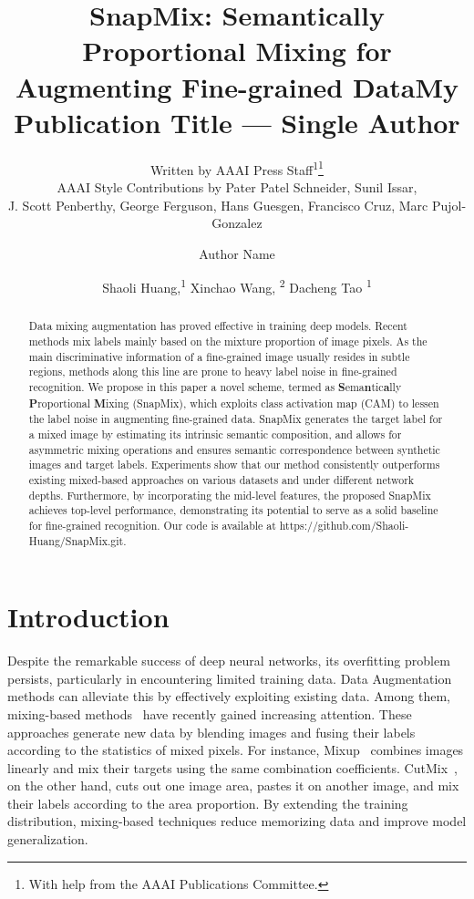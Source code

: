 \documentclass[letterpaper]{article} \usepackage{aaai21}  \usepackage{times}  \usepackage{helvet} \usepackage{courier}  \usepackage[hyphens]{url}  \usepackage{graphicx} \urlstyle{rm} \def\UrlFont{\rm}  \usepackage{natbib}  \usepackage{caption} \frenchspacing  \setlength{\pdfpagewidth}{8.5in}  \setlength{\pdfpageheight}{11in}
\title{SnapMix: Semantically Proportional Mixing for Augmenting Fine-grained Data}
\author{

Written by AAAI Press Staff\textsuperscript{\rm 1}\thanks{With help from the AAAI Publications Committee.}\\
    AAAI Style Contributions by Pater Patel Schneider,
    Sunil Issar,  \\
    J. Scott Penberthy,
    George Ferguson,
    Hans Guesgen,
    Francisco Cruz,
    Marc Pujol-Gonzalez
    \\
}
\title{My Publication Title --- Single Author}
\author {
Author Name \\
}
\author {
Shaoli Huang,\textsuperscript{\rm 1}
        Xinchao Wang, \textsuperscript{\rm 2}
        Dacheng Tao \textsuperscript{\rm 1} \\
}
\begin{document}
\maketitle

\begin{abstract}
Data mixing augmentation has proved effective in training deep models.
Recent methods mix labels mainly based on the mixture proportion of image pixels. 
As the main discriminative information of a fine-grained image usually resides in subtle regions, 
methods along this line are prone to heavy label noise in fine-grained recognition.
We propose in this paper a novel scheme, termed as
\textbf{S}ema\textbf{n}tic\textbf{a}lly \textbf{P}roportional \textbf{M}ixing (SnapMix),
which exploits class activation map (CAM) to lessen the label noise in augmenting fine-grained data. SnapMix generates the target label for a mixed image by estimating its intrinsic semantic composition, and allows for asymmetric mixing operations 
and ensures semantic correspondence between synthetic images and target labels. 
Experiments show that our method consistently outperforms existing mixed-based approaches  on various datasets and under different network depths.
Furthermore, by incorporating the mid-level features, the proposed SnapMix achieves top-level performance, demonstrating its potential to serve as 
a solid baseline for fine-grained recognition. Our code is available at https://github.com/Shaoli-Huang/SnapMix.git.
\end{abstract}

\section{Introduction}

\noindent Despite the remarkable success of deep neural networks,  
its overfitting problem persists, particularly in encountering 
limited training data. Data Augmentation methods can alleviate 
this by effectively exploiting existing data. Among them,  
mixing-based 
methods~\cite{tokozume2018between,inoue2018data,zhang2017mixup,yun2019cutmix} have
recently gained increasing attention.  
These approaches generate new data by blending images and fusing their labels according to the statistics of mixed pixels. 
For instance, Mixup~\cite{zhang2017mixup} combines images linearly and mix their targets using the same combination coefficients. CutMix~\cite{yun2019cutmix},
on the other hand,
cuts out one image area, pastes it on another image, and mix their labels according to the area proportion.  
By extending the training distribution, mixing-based techniques reduce memorizing data and improve model generalization. 
\end{document}
